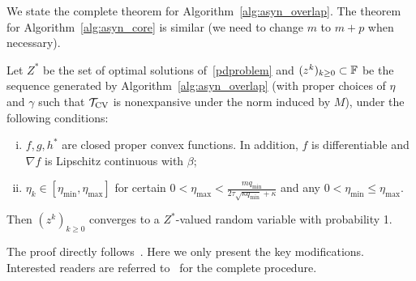 {We state the complete theorem for Algorithm~\ref{alg:asyn_overlap}. The theorem for Algorithm~\ref{alg:asyn_core} is similar (we need to change $m$ to $m+p$ when necessary).
\begin{thm}\label{thm:async-convergence2}
Let $Z^*$ be the set of optimal solutions of~\eqref{pdproblem} and $(z^k)_{k\geq0}\subset \mathbb{F}$ be the sequence generated by Algorithm~\ref{alg:asyn_overlap} (with proper choices of $\eta$ and $\gamma$ such that ${{\mathcal{T}}_{\textnormal{CV}}}$ is nonexpansive under the norm induced by $M$), under the following conditions:
\begin{enumerate}[(i)]
\item $f,g,h^*$ are closed proper convex functions. In addition, $f$ is differentiable and $\nabla f$ is Lipschitz continuous with $\beta$;
\item $\eta_k
\in [\eta_{\min}, \eta_{\max}]$ for certain $0<\eta_{\max}<\frac{mq_{\min}}{2\tau
\sqrt{\kappa q_{\min}}+\kappa}$ and any $0<\eta_{\min}\leq\eta_{\max}$.
\end{enumerate}
Then $(z^k)_{k\geq 0}$ converges to a $Z^*$-valued random variable with probability 1.
\end{thm}
The proof directly follows~\cite[Section 3]{Peng_2015_AROCK}. Here we only present the key modifications. Interested readers are referred to~\cite{Peng_2015_AROCK} for the complete procedure.
 
}
